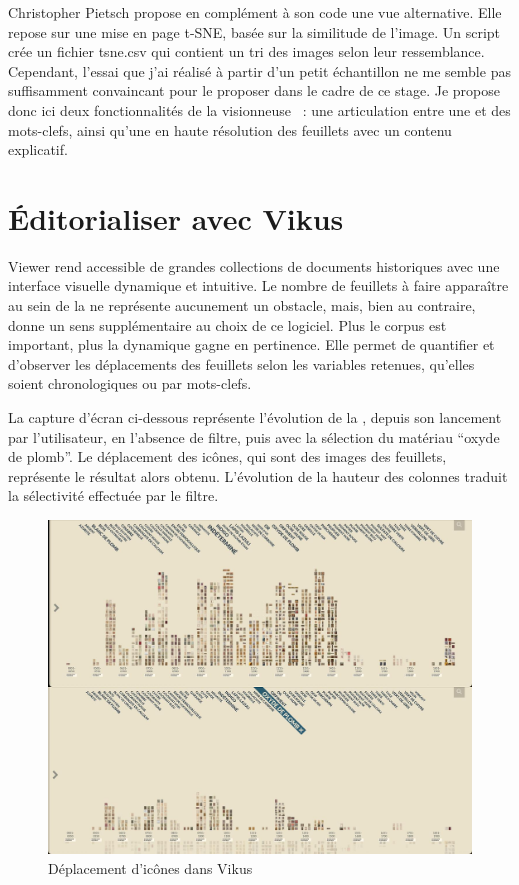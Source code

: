 Christopher Pietsch propose en complément à son code une vue alternative. Elle repose sur une mise en page t-SNE, basée sur la similitude de l'image. Un script crée un fichier tsne.csv qui contient un tri des images selon leur ressemblance. Cependant, l’essai que j’ai réalisé à partir d’un petit échantillon ne me semble pas suffisamment convaincant pour le proposer dans le cadre de ce stage. Je propose donc ici deux fonctionnalités de la visionneuse ~: une articulation entre une  et des mots-clefs, ainsi qu’une  en haute résolution des feuillets avec un contenu explicatif. \newpage

\section{Éditorialiser avec Vikus}

 Viewer rend accessible de grandes collections de documents historiques avec une interface visuelle dynamique et intuitive. Le nombre de feuillets à faire apparaître au sein de la  ne représente aucunement un obstacle, mais, bien au contraire, donne un sens supplémentaire au choix de ce logiciel. Plus le corpus est important, plus la  dynamique gagne en pertinence. Elle permet de quantifier et d’observer les déplacements des feuillets selon les variables retenues, qu’elles soient chronologiques ou par mots-clefs.\par
La capture d’écran ci-dessous représente l’évolution de la , depuis son lancement par l’utilisateur, en l’absence de filtre, puis avec la sélection du matériau \enquote{oxyde de plomb}. Le déplacement des icônes, qui sont des images des feuillets, représente le résultat alors obtenu. L’évolution de la hauteur des colonnes traduit la sélectivité effectuée par le filtre.\par
\begin{figure}[H]
	\centering
	\includegraphics[width=\textwidth]{./textes/chap3/vikus-dyna.jpg}
	\caption{Déplacement d'icônes dans Vikus}
	\label{fig:info}
\end{figure}

